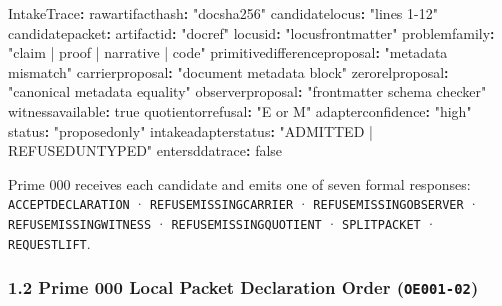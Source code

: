 \documentclass[
  11pt,
]{article}
\newenvironment{Shaded}{}{}
\newcommand{\AttributeTok}[1]{\textcolor[rgb]{0.49,0.56,0.16}{#1}}
\newcommand{\CharTok}[1]{\textcolor[rgb]{0.25,0.44,0.63}{#1}}
\newcommand{\FunctionTok}[1]{\textcolor[rgb]{0.02,0.16,0.49}{#1}}
\newcommand{\KeywordTok}[1]{\textcolor[rgb]{0.00,0.44,0.13}{\textbf{#1}}}
\newcommand{\StringTok}[1]{\textcolor[rgb]{0.25,0.44,0.63}{#1}}
\renewcommand{\_}{\origunderscore\allowbreak}
\begin{document}
\begin{Shaded}
\begin{Highlighting}[]
\FunctionTok{IntakeTrace}\KeywordTok{:}
\AttributeTok{  }\FunctionTok{raw\_artifact\_hash}\KeywordTok{:}\AttributeTok{ }\StringTok{"doc\_001\_sha256"}
\AttributeTok{  }\FunctionTok{candidate\_locus}\KeywordTok{:}\AttributeTok{ }\StringTok{"lines 1{-}12"}
\AttributeTok{  }\FunctionTok{candidate\_packet}\KeywordTok{:}
\AttributeTok{    }\FunctionTok{artifact\_id}\KeywordTok{:}\AttributeTok{ }\StringTok{"doc\_001\_ref"}
\AttributeTok{    }\FunctionTok{locus\_id}\KeywordTok{:}\AttributeTok{ }\StringTok{"locus\_frontmatter\_01"}
\AttributeTok{    }\FunctionTok{problem\_family}\KeywordTok{:}\AttributeTok{ }\StringTok{"claim | proof | narrative | code"}
\AttributeTok{    }\FunctionTok{primitive\_difference\_proposal}\KeywordTok{:}\AttributeTok{ }\StringTok{"metadata mismatch"}
\AttributeTok{    }\FunctionTok{carrier\_proposal}\KeywordTok{:}\AttributeTok{ }\StringTok{"document metadata block"}
\AttributeTok{    }\FunctionTok{zero\_rel\_proposal}\KeywordTok{:}\AttributeTok{ }\StringTok{"canonical metadata equality"}
\AttributeTok{    }\FunctionTok{observer\_proposal}\KeywordTok{:}\AttributeTok{ }\StringTok{"frontmatter schema checker"}
\AttributeTok{    }\FunctionTok{witness\_available}\KeywordTok{:}\AttributeTok{ }\CharTok{true}
\AttributeTok{    }\FunctionTok{quotient\_or\_refusal}\KeywordTok{:}\AttributeTok{ }\StringTok{"E or M"}
\AttributeTok{    }\FunctionTok{adapter\_confidence}\KeywordTok{:}\AttributeTok{ }\StringTok{"high"}
\AttributeTok{    }\FunctionTok{status}\KeywordTok{:}\AttributeTok{ }\StringTok{"proposed\_only"}
\AttributeTok{  }\FunctionTok{intake\_adapter\_status}\KeywordTok{:}\AttributeTok{ }\StringTok{"ADMITTED | REFUSED\_UNTYPED"}
\AttributeTok{  }\FunctionTok{enters\_dda\_trace}\KeywordTok{:}\AttributeTok{ }\CharTok{false}
\end{Highlighting}
\end{Shaded}

Prime 000 receives each candidate and emits one of seven formal
responses: \texttt{ACCEPT\_DECLARATION} ·
\texttt{REFUSE\_MISSING\_CARRIER} · \texttt{REFUSE\_MISSING\_OBSERVER} ·
\texttt{REFUSE\_MISSING\_WITNESS} · \texttt{REFUSE\_MISSING\_QUOTIENT} ·
\texttt{SPLIT\_PACKET} · \texttt{REQUEST\_LIFT}.

\subsubsection{\texorpdfstring{1.2 Prime 000 Local Packet Declaration
Order
(\texttt{OE001-02})}{1.2 Prime 000 Local Packet Declaration Order (OE001-02)}}\label{prime-000-local-packet-declaration-order-oe001-02}
\end{document}
